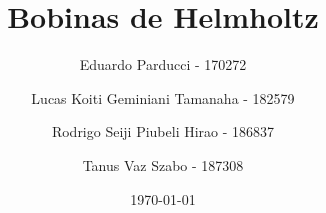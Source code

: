 \title{Bobinas de Helmholtz}
\author{
    Eduardo Parducci - 170272
    \and
    Lucas Koiti Geminiani Tamanaha - 182579
    \and
    Rodrigo Seiji Piubeli Hirao - 186837
    \and
    Tanus Vaz Szabo - 187308
}
\date{\today}